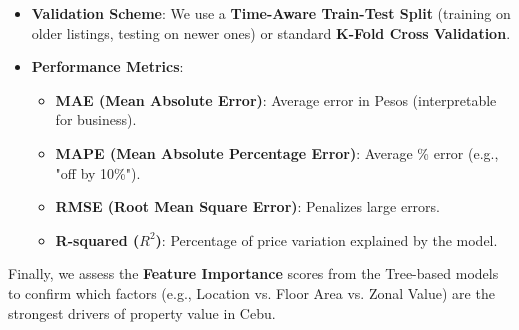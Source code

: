 \begin{itemize}
    \item \textbf{Validation Scheme}: We use a \textbf{Time-Aware Train-Test Split} (training on older listings, testing on newer ones) or standard \textbf{K-Fold Cross Validation}.
    \item \textbf{Performance Metrics}:
    \begin{itemize}
        \item \textbf{MAE (Mean Absolute Error)}: Average error in Pesos (interpretable for business).
        \item \textbf{MAPE (Mean Absolute Percentage Error)}: Average \% error (e.g., "off by 10\%").
        \item \textbf{RMSE (Root Mean Square Error)}: Penalizes large errors.
        \item \textbf{R-squared ($R^2$)}: Percentage of price variation explained by the model.
    \end{itemize}
\end{itemize}

Finally, we assess the \textbf{Feature Importance} scores from the Tree-based models to confirm which factors (e.g., Location vs. Floor Area vs. Zonal Value) are the strongest drivers of property value in Cebu.
